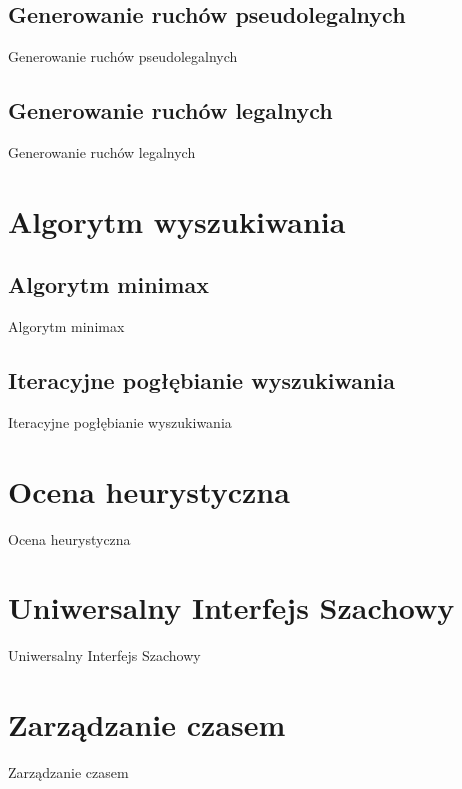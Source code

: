 \subsection{Generowanie ruchów pseudolegalnych}
\label{subsec:generowanie-ruchow-pseudolegalnych}

Generowanie ruchów pseudolegalnych

\subsection{Generowanie ruchów legalnych}
\label{subsec:generowanie-ruchow-legalnych}

Generowanie ruchów legalnych







\section{Algorytm wyszukiwania}
\label {sec:algorytm-wyszukiwania}


\subsection{Algorytm minimax}
\label{subsec:algorytm-minimax}

Algorytm minimax

\subsection{Iteracyjne pogłębianie wyszukiwania}
\label{subsec:iteracyjne-pogebianie-wyszukiwania2}

Iteracyjne pogłębianie wyszukiwania






\section{Ocena heurystyczna}
\label{sec:ocena-heurystyczna}

Ocena heurystyczna





\section{Uniwersalny Interfejs Szachowy}
\label{sec:uniwersalny-interfejs-szachowy}

Uniwersalny Interfejs Szachowy




\section{Zarządzanie czasem}
\label{sec:zarzadzanie-czasem}

Zarządzanie czasem

